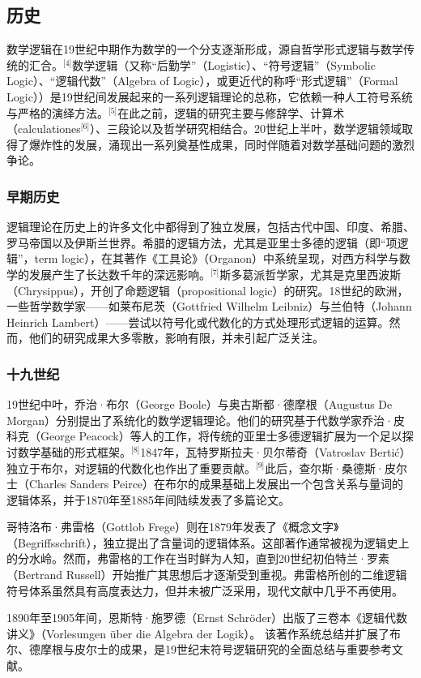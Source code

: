 \subsection{历史}
数学逻辑在19世纪中期作为数学的一个分支逐渐形成，源自哲学形式逻辑与数学传统的汇合。\(^\text{[4]}\)数学逻辑（又称“后勤学”（Logistic）、“符号逻辑”（Symbolic Logic）、“逻辑代数”（Algebra of Logic），或更近代的称呼“形式逻辑”（Formal Logic））是19世纪间发展起来的一系列逻辑理论的总称，它依赖一种人工符号系统与严格的演绎方法。\(^\text{[5]}\)在此之前，逻辑的研究主要与修辞学、计算术（calculationes\(^\text{[6]}\)）、三段论以及哲学研究相结合。20世纪上半叶，数学逻辑领域取得了爆炸性的发展，涌现出一系列奠基性成果，同时伴随着对数学基础问题的激烈争论。
\subsubsection{早期历史}
逻辑理论在历史上的许多文化中都得到了独立发展，包括古代中国、印度、希腊、罗马帝国以及伊斯兰世界。希腊的逻辑方法，尤其是亚里士多德的逻辑（即“项逻辑”，term logic），在其著作《工具论》（Organon）中系统呈现，对西方科学与数学的发展产生了长达数千年的深远影响。\(^\text{[7]}\)斯多葛派哲学家，尤其是克里西波斯（Chrysippus），开创了命题逻辑（propositional logic）的研究。18世纪的欧洲，一些哲学数学家——如莱布尼茨（Gottfried Wilhelm Leibniz）与兰伯特（Johann Heinrich Lambert）——尝试以符号化或代数化的方式处理形式逻辑的运算。然而，他们的研究成果大多零散，影响有限，并未引起广泛关注。
\subsubsection{十九世纪}
19世纪中叶，乔治·布尔（George Boole）与奥古斯都·德摩根（Augustus De Morgan）分别提出了系统化的数学逻辑理论。他们的研究基于代数学家乔治·皮科克（George Peacock）等人的工作，将传统的亚里士多德逻辑扩展为一个足以探讨数学基础的形式框架。\(^\text{[8]}\)1847年，瓦特罗斯拉夫·贝尔蒂奇（Vatroslav Bertić）独立于布尔，对逻辑的代数化也作出了重要贡献。\(^\text{[9]}\)此后，查尔斯·桑德斯·皮尔士（Charles Sanders Peirce）在布尔的成果基础上发展出一个包含关系与量词的逻辑体系，并于1870年至1885年间陆续发表了多篇论文。

哥特洛布·弗雷格（Gottlob Frege）则在1879年发表了《概念文字》（Begriffsschrift），独立提出了含量词的逻辑体系。这部著作通常被视为逻辑史上的分水岭。然而，弗雷格的工作在当时鲜为人知，直到20世纪初伯特兰·罗素（Bertrand Russell）开始推广其思想后才逐渐受到重视。弗雷格所创的二维逻辑符号体系虽然具有高度表达力，但并未被广泛采用，现代文献中几乎不再使用。

1890年至1905年间，恩斯特·施罗德（Ernst Schröder）出版了三卷本《逻辑代数讲义》（Vorlesungen über die Algebra der Logik）。  
该著作系统总结并扩展了布尔、德摩根与皮尔士的成果，是19世纪末符号逻辑研究的全面总结与重要参考文献。

